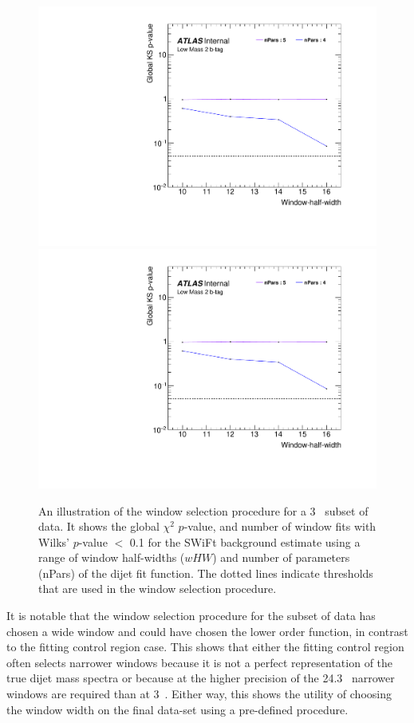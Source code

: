 \begin{figure}[!htb]
\captionsetup[subfigure]{aboveskip=0pt,justification=centering}
\centering
{} {
  \includegraphics[width=0.45\linewidth, angle=0,page=2]{figs/Dibjet/LowMass/FitStudy_min566/windowSel_subset.pdf}
}\hspace{-8mm}
 {
  \includegraphics[width=0.45\linewidth, angle=0,page=4]{figs/Dibjet/LowMass/FitStudy_min566/windowSel_subset.pdf}
}

\caption{\label{fig:windowSel_subset}
  An illustration of the window selection procedure for a 3~\ifb{} subset of \lm{} data.
  It shows the global $\chi^{2}$ \mbox{$p$-value}, %
  and number of window fits with Wilks' \mbox{$p$-value} $<$ 0.1 for the SWiFt background estimate
  using a range of window half-widths ($wHW$) and number of parameters (nPars) of the dijet fit function.
  The dotted lines indicate thresholds that are used in the window selection procedure.
}
\vspace{-1em}
\end{figure}

It is notable that the window selection procedure for the subset of data has chosen a wide window and
could have chosen the lower order function, in contrast to the fitting control region case. 
This shows that either the fitting control region often selects narrower windows
because it is not a perfect representation of the true dijet mass spectra
or because at the higher precision of the 24.3~\ifb{} narrower windows are required than at 3~\ifb{}.
Either way, this shows the utility of choosing the window width on the final data-set using a pre-defined procedure.

